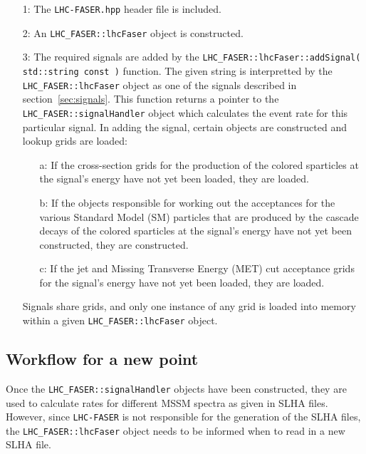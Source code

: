 \documentclass[10pt]{article}
\newcommand{\sect}[1]{section~\ref{#1}\xspace}
\newcommand{\faser}[0]{\texttt{LHC-FASER}\xspace}
\newcommand{\lf}[1]{\texttt{LHC\_FASER::#1}}
\begin{document}
\begin{itemize}

\item[1:] The \texttt{LHC-FASER.hpp} header file is included.

\item[2:] An \lf{lhcFaser} object is constructed.

\item[3:] The required signals are added by the
          \lf{lhcFaser::addSignal( std::string const )} function. The given
          string is interpretted by the \lf{lhcFaser} object as one of the
          signals described in \sect{sec:signals}.
          This function returns a pointer to the \lf{signalHandler} object which
          calculates the event rate for this particular signal.
          In adding the signal, certain objects are constructed and lookup grids
          are loaded:

  \begin{itemize}

  \item[a:] If the cross-section grids for the production of the colored
            sparticles at the signal's energy have not yet been loaded, they are
            loaded.

  \item[b:] If the objects responsible for working out the acceptances for the
            various Standard Model (SM) particles that are produced by the
            cascade decays of the colored sparticles at the signal's energy have
            not yet been constructed, they are constructed.

  \item[c:] If the jet and Missing Transverse Energy (MET) cut acceptance grids
            for the signal's energy have not yet been loaded, they are loaded.

  \end{itemize}

          Signals share grids, and only one instance of any grid is loaded into
          memory within a given \lf{lhcFaser} object.

\end{itemize}


\subsection{Workflow for a new point}
\label{subsec:pointflow}

Once the \lf{signalHandler} objects have been constructed, they are used to
 calculate rates for different MSSM spectra as given in SLHA files. However,
 since \faser is not responsible for the generation of the SLHA files, the
 \lf{lhcFaser} object needs to be informed when to read in a new SLHA file.
\end{document}
